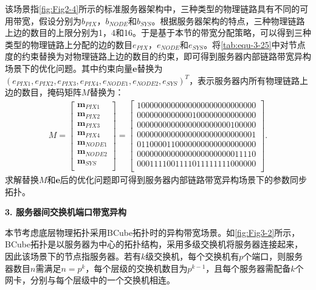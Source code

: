 该场景指\autoref{fig:Fig2-4}所示的标准服务器架构中，三种类型的物理链路具有不同的可用带宽，假设分别为$b_{PIX}$，$b_{NODE}$和$b_{SYS}$。根据服务器架构的特点，三种物理链路上边的数目的上限分别为1，4和16。于是基于本节的带宽分配策略，可以得到三种类型的物理链路上分配的边的数目$e_{PIX}$，$e_{NODE}$和$e_{SYS}$。将\autoref{tab:equ-3-25}中对节点度的约束替换为对物理链路上边的数目的约束，即可得到服务器内部链路带宽异构场景下的优化问题。其中约束向量$\boldsymbol{e}$替换为$\left( e_{PIX1},e_{PIX2},e_{PIX3},e_{PIX4},e_{NODE1},e_{NODE2},e_{SYS} \right) ^T$，表示服务器内所有物理链路上边的数目，掩码矩阵$M$替换为：
\begin{equation}
    \begin{aligned}
    \label{tab:equ-3-26}
    M=\left[ \begin{array}{c}
        \boldsymbol{m}_{PIX1}\\
        \boldsymbol{m}_{PIX2}\\
        \boldsymbol{m}_{PIX3}\\
        \boldsymbol{m}_{PIX4}\\
        \boldsymbol{m}_{NODE1}\\
        \boldsymbol{m}_{NODE2}\\
        \boldsymbol{m}_{SYS}\\
    \end{array} \right] =\left[ \begin{matrix}
            1000000000000000000000000000\\
            0000000000000100000000000000\\
            0000000000000000000000100000\\
            0000000000000000000000000001\\
            0110000110000000000000000000\\
            0000000000000000000000011110\\
            0001111001111011111111000000\\
    \end{matrix} \right].
    \end{aligned}
\end{equation}
求解替换$M$和$\boldsymbol{e}$后的优化问题即可得到服务器内部链路带宽异构场景下的参数同步拓扑。

\textbf{3. 服务器间交换机端口带宽异构}

本节考虑底层物理拓扑采用BCube拓扑\cite{guo2009bcube}时的异构带宽场景。如\autoref{fig:Fig3-2}所示，BCube拓扑是以服务器为中心的拓扑结构，采用多级交换机将服务器连接起来，因此该场景下的节点指服务器。若有$k$级交换机，每个交换机有$p$个端口，则服务器数目$n$需满足$n=p^k$，每个层级的交换机数目为$p^{k-1}$，且每个服务器需配备$k$个网卡，分别与每个层级中的一个交换机相连。

